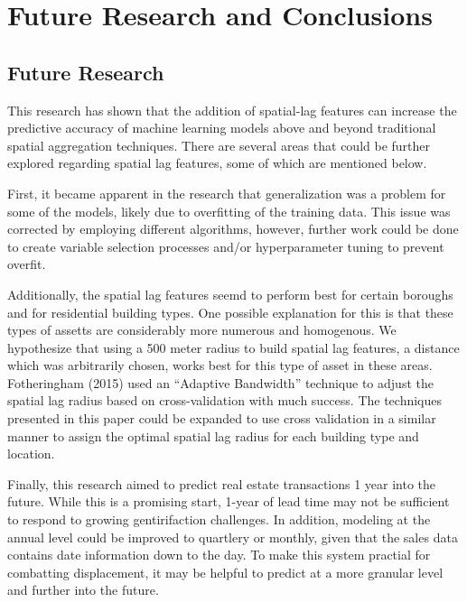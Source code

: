 \documentclass[12pt,]{article}
\begin{document}
\hypertarget{future-research-and-conclusions}{%
\section{Future Research and
Conclusions}\label{future-research-and-conclusions}}

\hypertarget{future-research}{%
\subsection{Future Research}\label{future-research}}

This research has shown that the addition of spatial-lag features can
increase the predictive accuracy of machine learning models above and
beyond traditional spatial aggregation techniques. There are several
areas that could be further explored regarding spatial lag features,
some of which are mentioned below.

First, it became apparent in the research that generalization was a
problem for some of the models, likely due to overfitting of the
training data. This issue was corrected by employing different
algorithms, however, further work could be done to create variable
selection processes and/or hyperparameter tuning to prevent overfit.

Additionally, the spatial lag features seemd to perform best for certain
boroughs and for residential building types. One possible explanation
for this is that these types of assetts are considerably more numerous
and homogenous. We hypothesize that using a 500 meter radius to build
spatial lag features, a distance which was arbitrarily chosen, works
best for this type of asset in these areas. Fotheringham (2015) used an
``Adaptive Bandwidth'' technique to adjust the spatial lag radius based
on cross-validation with much success. The techniques presented in this
paper could be expanded to use cross validation in a similar manner to
assign the optimal spatial lag radius for each building type and
location.

Finally, this research aimed to predict real estate transactions 1 year
into the future. While this is a promising start, 1-year of lead time
may not be sufficient to respond to growing gentirifaction challenges.
In addition, modeling at the annual level could be improved to quartlery
or monthly, given that the sales data contains date information down to
the day. To make this system practial for combatting displacement, it
may be helpful to predict at a more granular level and further into the
future.
\end{document}
